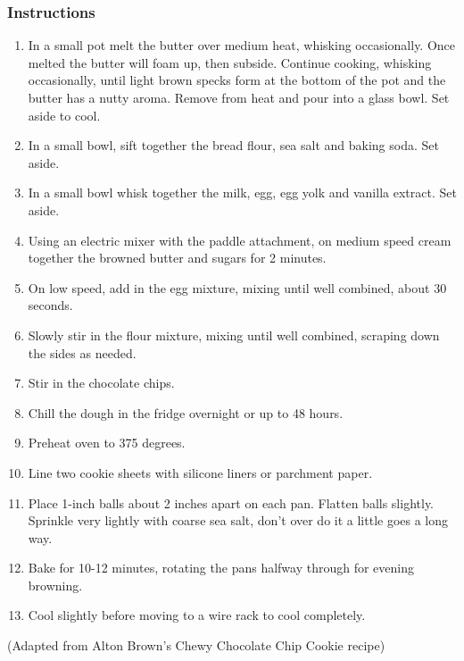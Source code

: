 \documentclass{article}
\begin{document}
\subsubsection{Instructions}
\begin{enumerate}
\item In a small pot melt the butter over medium heat, whisking occasionally. Once melted the butter will foam up, then subside. Continue cooking, whisking occasionally, until light brown specks form at the bottom of the pot and the butter has a nutty aroma. Remove from heat and pour into a glass bowl. Set aside to cool.
\item In a small bowl, sift together the bread flour, sea salt and baking soda. Set aside.
\item In a small bowl whisk together the milk, egg, egg yolk and vanilla extract. Set aside.
\item Using an electric mixer with the paddle attachment, on medium speed cream together the browned butter and sugars for 2 minutes.
\item On low speed, add in the egg mixture, mixing until well combined, about 30 seconds.
\item Slowly stir in the flour mixture, mixing until well combined, scraping down the sides as needed.
\item Stir in the chocolate chips.
\item Chill the dough in the fridge overnight or up to 48 hours.
\item Preheat oven to 375 degrees.
\item Line two cookie sheets with silicone liners or parchment paper.
\item Place 1-inch balls about 2 inches apart on each pan. Flatten balls slightly. Sprinkle very lightly with coarse sea salt, don't over do it a little goes a long way.
\item Bake for 10-12 minutes, rotating the pans halfway through for evening browning.
\item Cool slightly before moving to a wire rack to cool completely.
\end{enumerate}
(Adapted from Alton Brown’s Chewy Chocolate Chip Cookie recipe) 
\end{document}
